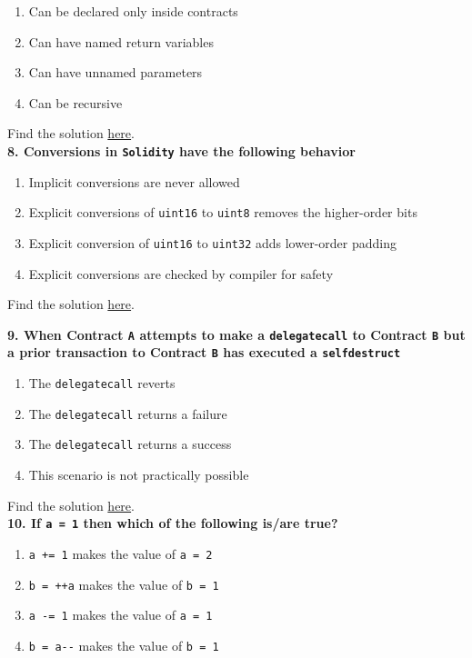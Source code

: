 \begin{enumerate}[label=\Alph*.]
    \item Can be declared only inside contracts
    \item Can have named return variables
    \item Can have unnamed parameters
    \item Can be recursive
\end{enumerate}

Find the solution \hyperref[sec:exam2_q7]{here}.\\

\textbf{8. Conversions in \texttt{Solidity} have the following behavior}

\begin{enumerate}[label=\Alph*.]
    \item Implicit conversions are never allowed
    \item Explicit conversions of \verb|uint16| to \verb|uint8| removes the higher-order bits
    \item Explicit conversion of \verb|uint16| to \verb|uint32| adds lower-order padding
    \item Explicit conversions are checked by compiler for safety
\end{enumerate}

Find the solution \hyperref[sec:exam2_q8]{here}.\\

\pagebreak

\textbf{9. When Contract \texttt{A} attempts to make a \texttt{delegatecall} to Contract \texttt{B} but a prior transaction to Contract \texttt{B} has executed a \texttt{selfdestruct}}

\begin{enumerate}[label=\Alph*.]
    \item The \verb|delegatecall| reverts
    \item The \verb|delegatecall| returns a failure
    \item The \verb|delegatecall| returns a success
    \item This scenario is not practically possible
\end{enumerate}

Find the solution \hyperref[sec:exam2_q9]{here}.\\

\textbf{10. If \texttt{a = 1} then which of the following is/are true?}

\begin{enumerate}[label=\Alph*.]
    \item\verb|a += 1| makes the value of \verb|a = 2|
    \item\verb|b = ++a| makes the value of \verb|b = 1|
    \item\verb|a -= 1| makes the value of \verb|a = 1|
    \item\verb|b = a--| makes the value of \verb|b = 1|
\end{enumerate}

